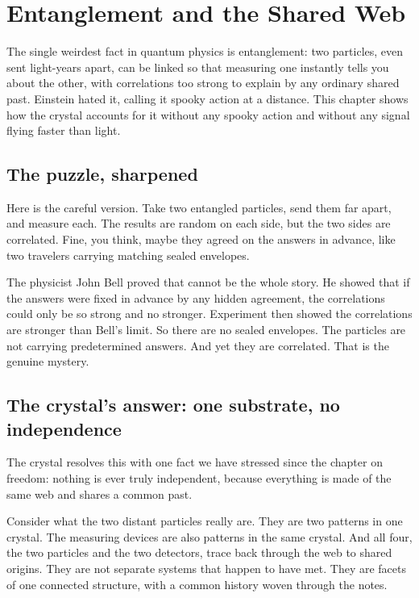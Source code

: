 \section{Entanglement and the Shared Web}

The single weirdest fact in quantum physics is entanglement: two particles, even sent light-years apart, can be linked so that measuring one instantly tells you about the other, with correlations too strong to explain by any ordinary shared past. Einstein hated it, calling it spooky action at a distance. This chapter shows how the crystal accounts for it without any spooky action and without any signal flying faster than light.

\subsection{The puzzle, sharpened}

Here is the careful version. Take two entangled particles, send them far apart, and measure each. The results are random on each side, but the two sides are correlated. Fine, you think, maybe they agreed on the answers in advance, like two travelers carrying matching sealed envelopes.

The physicist John Bell proved that cannot be the whole story. He showed that if the answers were fixed in advance by any hidden agreement, the correlations could only be so strong and no stronger. Experiment then showed the correlations are stronger than Bell's limit. So there are no sealed envelopes. The particles are not carrying predetermined answers. And yet they are correlated. That is the genuine mystery.

\subsection{The crystal's answer: one substrate, no independence}

The crystal resolves this with one fact we have stressed since the chapter on freedom: nothing is ever truly independent, because everything is made of the same web and shares a common past.

Consider what the two distant particles really are. They are two patterns in one crystal. The measuring devices are also patterns in the same crystal. And all four, the two particles and the two detectors, trace back through the web to shared origins. They are not separate systems that happen to have met. They are facets of one connected structure, with a common history woven through the notes.

